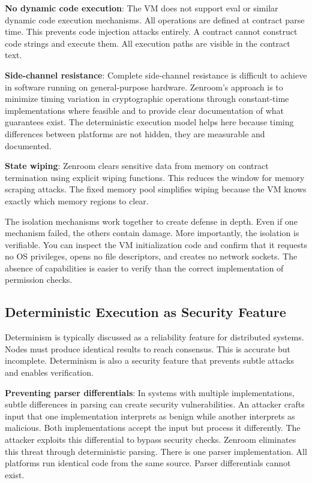 \textbf{No dynamic code execution}: The VM does not support eval or
similar dynamic code execution mechanisms. All operations are defined
at contract parse time. This prevents code injection attacks
entirely. A contract cannot construct code strings and execute
them. All execution paths are visible in the contract text.

\textbf{Side-channel resistance}: Complete side-channel resistance is
difficult to achieve in software running on general-purpose
hardware. Zenroom's approach is to minimize timing variation in
cryptographic operations through constant-time implementations where
feasible and to provide clear documentation of what guarantees
exist. The deterministic execution model helps here because timing
differences between platforms are not hidden, they are measurable and
documented.

\textbf{State wiping}: Zenroom clears sensitive data from memory on
contract termination using explicit wiping functions. This reduces the
window for memory scraping attacks. The fixed memory pool simplifies
wiping because the VM knows exactly which memory regions to clear.

The isolation mechanisms work together to create defense in
depth. Even if one mechanism failed, the others contain damage. More
importantly, the isolation is verifiable. You can inspect the VM
initialization code and confirm that it requests no OS privileges,
opens no file descriptors, and creates no network sockets. The absence
of capabilities is easier to verify than the correct implementation of
permission checks.

\subsection{Deterministic Execution as Security Feature}

Determinism is typically discussed as a reliability feature for
distributed systems. Nodes must produce identical results to reach
consensus. This is accurate but incomplete. Determinism is also a
security feature that prevents subtle attacks and enables
verification.

\textbf{Preventing parser differentials}: In systems with multiple
implementations, subtle differences in parsing can create security
vulnerabilities. An attacker crafts input that one implementation
interprets as benign while another interprets as malicious. Both
implementations accept the input but process it differently. The
attacker exploits this differential to bypass security checks. Zenroom
eliminates this threat through deterministic parsing. There is one
parser implementation. All platforms run identical code from the same
source. Parser differentials cannot exist.

